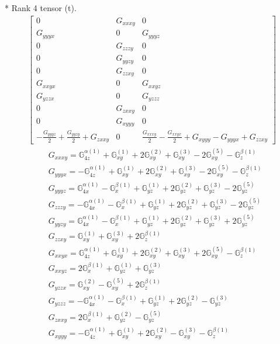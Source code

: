 \documentclass[fleqn,8pt,landscape]{jsarticle}
\begin{document}
* Rank 4 tensor (t).
\begin{align*}
\begin{bmatrix} 0 & G_{xxxy} & 0 \\ G_{yyyx} & 0 & G_{yyyz} \\ 0 & G_{zzzy} & 0 \\ 0 & G_{yyzy} & 0 \\ 0 & G_{zzxy} & 0 \\ G_{xxyx} & 0 & G_{xxyz} \\ G_{yzzx} & 0 & G_{yzzz} \\ 0 & G_{zxxy} & 0 \\ 0 & G_{xyyy} & 0 \\ - \frac{G_{yyyz}}{2} + \frac{G_{yyzy}}{2} + G_{zxxy} & 0 & \frac{G_{xxxy}}{2} - \frac{G_{xxyx}}{2} + G_{xyyy} - G_{yyyx} + G_{zzxy} \end{bmatrix}
\end{align*}
\begin{align*}
& G_{xxxy} = \mathbb{G}_{4z}^{\alpha(1)} + \mathbb{G}_{xy}^{(1)} + 2 \mathbb{G}_{xy}^{(2)} + \mathbb{G}_{xy}^{(3)} - 2 \mathbb{G}_{xy}^{(5)} - \mathbb{G}_{z}^{\beta(1)} \\
& G_{yyyx} = - \mathbb{G}_{4z}^{\alpha(1)} + \mathbb{G}_{xy}^{(1)} + 2 \mathbb{G}_{xy}^{(2)} + \mathbb{G}_{xy}^{(3)} - 2 \mathbb{G}_{xy}^{(5)} - \mathbb{G}_{z}^{\beta(1)} \\
& G_{yyyz} = \mathbb{G}_{4x}^{\alpha(1)} - \mathbb{G}_{x}^{\beta(1)} + \mathbb{G}_{yz}^{(1)} + 2 \mathbb{G}_{yz}^{(2)} + \mathbb{G}_{yz}^{(3)} - 2 \mathbb{G}_{yz}^{(5)} \\
& G_{zzzy} = - \mathbb{G}_{4x}^{\alpha(1)} - \mathbb{G}_{x}^{\beta(1)} + \mathbb{G}_{yz}^{(1)} + 2 \mathbb{G}_{yz}^{(2)} + \mathbb{G}_{yz}^{(3)} - 2 \mathbb{G}_{yz}^{(5)} \\
& G_{yyzy} = \mathbb{G}_{4x}^{\alpha(1)} - \mathbb{G}_{x}^{\beta(1)} + \mathbb{G}_{yz}^{(1)} + 2 \mathbb{G}_{yz}^{(2)} + \mathbb{G}_{yz}^{(3)} + 2 \mathbb{G}_{yz}^{(5)} \\
& G_{zzxy} = \mathbb{G}_{xy}^{(1)} + \mathbb{G}_{xy}^{(3)} + 2 \mathbb{G}_{z}^{\beta(1)} \\
& G_{xxyx} = \mathbb{G}_{4z}^{\alpha(1)} + \mathbb{G}_{xy}^{(1)} + 2 \mathbb{G}_{xy}^{(2)} + \mathbb{G}_{xy}^{(3)} + 2 \mathbb{G}_{xy}^{(5)} - \mathbb{G}_{z}^{\beta(1)} \\
& G_{xxyz} = 2 \mathbb{G}_{x}^{\beta(1)} + \mathbb{G}_{yz}^{(1)} + \mathbb{G}_{yz}^{(3)} \\
& G_{yzzx} = \mathbb{G}_{xy}^{(2)} - \mathbb{G}_{xy}^{(5)} + 2 \mathbb{G}_{z}^{\beta(1)} \\
& G_{yzzz} = - \mathbb{G}_{4x}^{\alpha(1)} - \mathbb{G}_{x}^{\beta(1)} + \mathbb{G}_{yz}^{(1)} + 2 \mathbb{G}_{yz}^{(2)} - \mathbb{G}_{yz}^{(3)} \\
& G_{zxxy} = 2 \mathbb{G}_{x}^{\beta(1)} + \mathbb{G}_{yz}^{(2)} - \mathbb{G}_{yz}^{(5)} \\
& G_{xyyy} = - \mathbb{G}_{4z}^{\alpha(1)} + \mathbb{G}_{xy}^{(1)} + 2 \mathbb{G}_{xy}^{(2)} - \mathbb{G}_{xy}^{(3)} - \mathbb{G}_{z}^{\beta(1)}
\end{align*}
\end{document}
